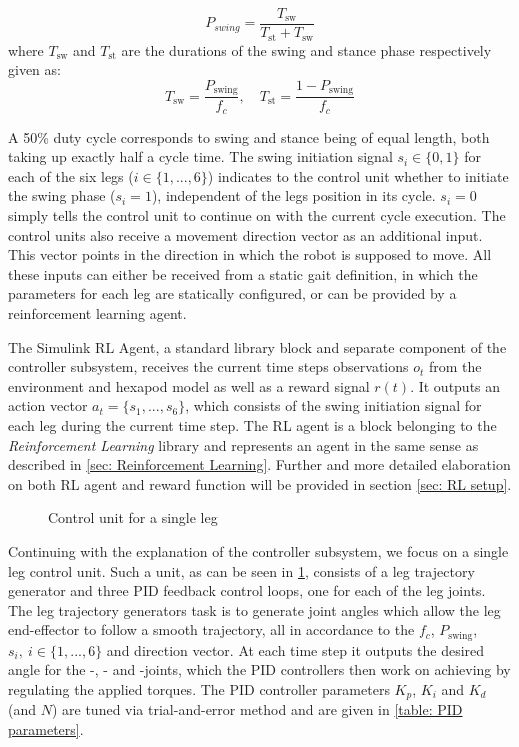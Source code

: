 \begin{equation}
P_{swing} = \frac{T_\text{sw}} {T_\text{st} + T_\text{sw}}
\end{equation}
where $T_\text{sw}$ and $T_\text{st}$ are the durations of the swing and stance phase respectively given as:
\begin{equation}
T_\text{sw} = \frac{P_\text{swing}}{f_c}, \quad T_\text{st} = \frac{1-P_\text{swing}}{f_c}
\end{equation}

A 50\% duty cycle corresponds to swing and stance being of equal length, both taking up exactly half a cycle time.
The swing initiation signal $s_i \in \{0,1\}$ for each of the six legs ($i \in \{1,...,6\}$) indicates to the control unit whether to initiate the swing phase ($s_i = 1$), independent of the legs position in its cycle.
$s_i = 0$ simply tells the control unit to continue on with the current cycle execution.
The control units also receive a movement direction vector as an additional input.
This vector points in the direction in which the robot is supposed to move.
All these inputs can either be received from a static gait definition, in which the parameters for each leg are statically configured, or can be provided by a reinforcement learning agent.

The Simulink RL Agent, a standard library block and separate component of the controller subsystem, receives the current time steps observations $o_t$ from the environment and hexapod model as well as a reward signal $r(t)$.
It outputs an action vector $a_t = \{s_1,...,s_6\}$, which consists of the swing initiation signal for each leg during the current time step.
The RL agent is a block belonging to the \textit{Reinforcement Learning} library and represents an agent in the same sense as described in \ref{sec: Reinforcement Learning}.
Further and more detailed elaboration on both RL agent and reward function will be provided in section \ref{sec: RL setup}.

\begin{figure}
	\centerline{}
	\caption{Control unit for a single leg}
	\label{figure: Leg control unit}
\end{figure}

Continuing  with the explanation of the controller subsystem, we focus on a single leg control unit.
Such a unit, as can be seen in \ref{figure: Leg control unit}, consists of a leg trajectory generator and three PID feedback control loops, one for each of the leg joints.
The leg trajectory generators task is to generate joint angles which allow the leg end-effector to follow a smooth trajectory, all in accordance to the $f_c$, $P_\text{swing}$, $s_i,\ i \in \{1,...,6\}$ and direction vector.
At each time step it outputs the desired angle for the \textalpha-, \textbeta- and \textgamma-joints, which the PID controllers then work on achieving by regulating the applied torques.
The PID controller parameters $K_p$, $K_i$ and $K_d$ (and $N$) are tuned via trial-and-error method and are given in \ref{table: PID parameters}.

